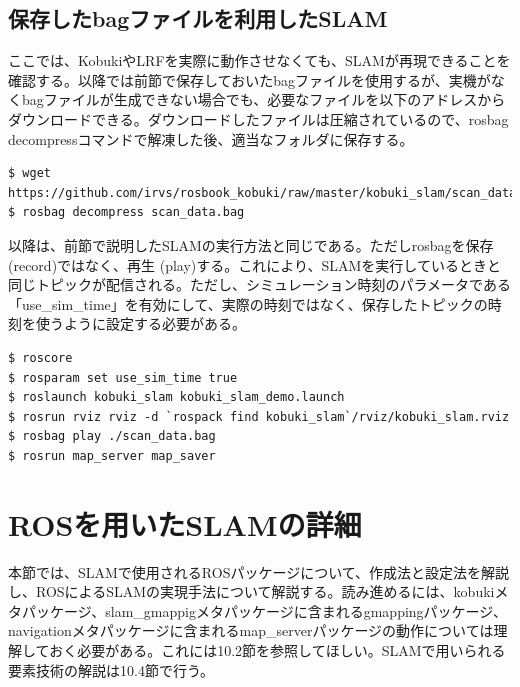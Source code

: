 \subsection{保存したbagファイルを利用したSLAM}

ここでは、KobukiやLRFを実際に動作させなくても、SLAMが再現できることを確認する。以降では前節で保存しておいたbagファイルを使用するが、実機がなくbagファイルが生成できない場合でも、必要なファイルを以下のアドレスからダウンロードできる。ダウンロードしたファイルは圧縮されているので、rosbag decompressコマンドで解凍した後、適当なフォルダに保存する。

\begin{lstlisting}[language=ROS]
$ wget https://github.com/irvs/rosbook_kobuki/raw/master/kobuki_slam/scan_data.bag
$ rosbag decompress scan_data.bag
\end{lstlisting}

以降は、前節で説明したSLAMの実行方法と同じである。ただしrosbagを保存 (record)ではなく、再生 (play)する。これにより、SLAMを実行しているときと同じトピックが配信される。ただし、シミュレーション時刻のパラメータである「use\_sim\_time」を有効にして、実際の時刻ではなく、保存したトピックの時刻を使うように設定する必要がある。

\begin{lstlisting}[language=ROS]
$ roscore
$ rosparam set use_sim_time true
$ roslaunch kobuki_slam kobuki_slam_demo.launch
$ rosrun rviz rviz -d `rospack find kobuki_slam`/rviz/kobuki_slam.rviz
$ rosbag play ./scan_data.bag
$ rosrun map_server map_saver
\end{lstlisting}

\section{ROSを用いたSLAMの詳細}

本節では、SLAMで使用されるROSパッケージについて、作成法と設定法を解説し、ROSによるSLAMの実現手法について解説する。読み進めるには、kobukiメタパッケージ、slam\_gmappigメタパッケージに含まれるgmappingパッケージ、navigationメタパッケージに含まれるmap\_serverパッケージの動作については理解しておく必要がある。これには10.2節を参照してほしい。SLAMで用いられる要素技術の解説は10.4節で行う。

